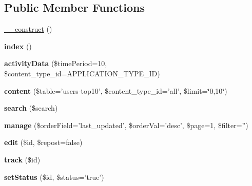 \subsection*{Public Member Functions}
\begin{DoxyCompactItemize}
\item 
\hyperlink{class_dashboard_controller_a095c5d389db211932136b53f25f39685}{\_\-\_\-construct} ()
\item 
\hypertarget{class_dashboard_controller_a149eb92716c1084a935e04a8d95f7347}{
{\bfseries index} ()}
\label{class_dashboard_controller_a149eb92716c1084a935e04a8d95f7347}

\item 
\hypertarget{class_dashboard_controller_a7faead9e9d45b972647f684a93ef78ff}{
{\bfseries activityData} (\$timePeriod=10, \$content\_\-type\_\-id=APPLICATION\_\-TYPE\_\-ID)}
\label{class_dashboard_controller_a7faead9e9d45b972647f684a93ef78ff}

\item 
\hypertarget{class_dashboard_controller_a7e2fc92578abd0c4d449e2a46f24c472}{
{\bfseries content} (\$table='users-\/top10', \$content\_\-type\_\-id='all', \$limit=\char`\"{}0,10\char`\"{})}
\label{class_dashboard_controller_a7e2fc92578abd0c4d449e2a46f24c472}

\item 
\hypertarget{class_dashboard_controller_a0d624b549023221829714196e71f38da}{
{\bfseries search} (\$search)}
\label{class_dashboard_controller_a0d624b549023221829714196e71f38da}

\item 
\hypertarget{class_dashboard_controller_ad7a8a1631b0c07e5eaac56371b48d5c8}{
{\bfseries manage} (\$orderField='last\_\-updated', \$orderVal='desc', \$page=1, \$filter='')}
\label{class_dashboard_controller_ad7a8a1631b0c07e5eaac56371b48d5c8}

\item 
\hypertarget{class_dashboard_controller_a3e2ca5065723bc35286c37f76b86fac2}{
{\bfseries edit} (\$id, \$repost=false)}
\label{class_dashboard_controller_a3e2ca5065723bc35286c37f76b86fac2}

\item 
\hypertarget{class_dashboard_controller_ad8175f372125900e5ecea121819ae056}{
{\bfseries track} (\$id)}
\label{class_dashboard_controller_ad8175f372125900e5ecea121819ae056}

\item 
\hypertarget{class_dashboard_controller_af0b62fe332bd7df6c993af3d74ca1c34}{
{\bfseries setStatus} (\$id, \$status='true')}
\label{class_dashboard_controller_af0b62fe332bd7df6c993af3d74ca1c34}


\end{DoxyCompactItemize}
